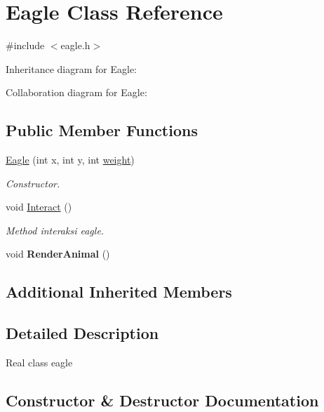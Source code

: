 \hypertarget{classEagle}{}\section{Eagle Class Reference}
\label{classEagle}


{\ttfamily \#include $<$eagle.\+h$>$}



Inheritance diagram for Eagle\+:


Collaboration diagram for Eagle\+:
\subsection*{Public Member Functions}
\begin{DoxyCompactItemize}
\item 
\hyperlink{classEagle_a9d26f3ded0b3377d7ff5252095ce171e}{Eagle} (int x, int y, int \hyperlink{classAnimal_a9a3b22f243f7109c57f36b3c660feb6e}{weight})
\begin{DoxyCompactList}\small\item\em Constructor. \end{DoxyCompactList}\item 
void \hyperlink{classEagle_a8658d302239800ed5beaf691cc1c4bfa}{Interact} ()\hypertarget{classEagle_a8658d302239800ed5beaf691cc1c4bfa}{}\label{classEagle_a8658d302239800ed5beaf691cc1c4bfa}

\begin{DoxyCompactList}\small\item\em Method interaksi eagle. \end{DoxyCompactList}\item 
void {\bfseries Render\+Animal} ()\hypertarget{classEagle_ab342b2350472fa3b3f0e6ca868c1b7ec}{}\label{classEagle_ab342b2350472fa3b3f0e6ca868c1b7ec}

\end{DoxyCompactItemize}
\subsection*{Additional Inherited Members}


\subsection{Detailed Description}
Real class eagle 

\subsection{Constructor \& Destructor Documentation}
